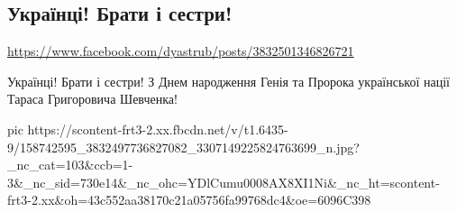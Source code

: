  
 
 
 
 

\subsection{Українці! Брати і сестри!}
\url{https://www.facebook.com/dyastrub/posts/3832501346826721}

Українці! Брати і сестри!
З Днем народження Генія та Пророка української нації Тараса Григоровича Шевченка!

\ifcmt
  pic https://scontent-frt3-2.xx.fbcdn.net/v/t1.6435-9/158742595_3832497736827082_3307149225824763699_n.jpg?_nc_cat=103&ccb=1-3&_nc_sid=730e14&_nc_ohc=YDlCumu0008AX8XI1Ni&_nc_ht=scontent-frt3-2.xx&oh=43c552aa38170c21a05756fa99768dc4&oe=6096C398
\fi

